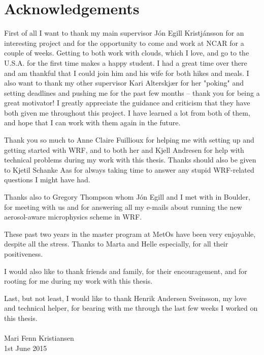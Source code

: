 \chapter*{Acknowledgements}

First of all I want to thank my main supervisor Jón Egill Kristjánsson for an interesting project and for the opportunity to come and work at NCAR for a couple of weeks. Getting to both work with clouds, which I love, and go to the U.S.A. for the first time makes a happy student. I had a great time over there and am thankful that I could join him and his wife for both hikes and meals. I also want to thank my other supervisor Kari Alterskjær for her "poking" and setting deadlines and pushing me for the past few months -- thank you for being a great motivator! I greatly appreciate the guidance and criticism that they have both given me throughout this project. I have learned a lot from both of them, and hope that I can work with them again in the future.

Thank you so much to Anne Claire Fuillioux for helping me with setting up and getting started with WRF, and to both her and Kjell Andresen for help with technical problems during my work with this thesis. Thanks should also be given to Kjetil Schanke Aas for always taking time to answer any stupid WRF-related questions I might have had.

Thanks also to Gregory Thompson whom Jón Egill and I met with in Boulder, for meeting with us and for answering all my e-mails about running the new aerosol-aware microphysics scheme in WRF.

These past two years in the master program at MetOs have been very enjoyable, despite all the stress. Thanks to Marta and Helle especially, for all their positiveness.

I would also like to thank friends and family, for their encouragement, and for rooting for me during my work with this thesis.

Last, but not least, I would like to thank Henrik Andersen Sveinsson, my love and technical helper, for bearing with me through the last few weeks I worked on this thesis.
\\ \text{   }\\Mari Fenn Kristiansen\\
1st June 2015